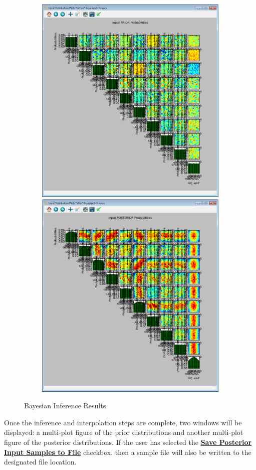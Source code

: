 \begin{figure}[H]
\centering
\includegraphics[width=6.5in,height=4in,keepaspectratio]{Chapt_uq/figs/tutorial/31a_InfPriorResults}
\centering
\includegraphics[width=6.5in,height=4in,keepaspectratio]{Chapt_uq/figs/tutorial/31_InfResults}
\caption{Bayesian Inference Results}
\label{fig:uqt_infer_results}
\end{figure}

Once the inference and interpolation steps are complete, two windows will
be displayed: a multi-plot figure of the prior distributions and another
multi-plot figure of the posterior distributions. 
If the user has selected the \textbf{\underline{Save Posterior Input Samples to File}} checkbox,
then a sample file will also be written to the designated file location.

